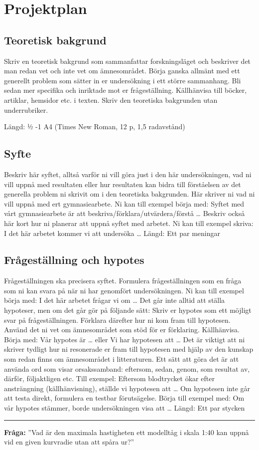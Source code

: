 \section{Projektplan}
\subsection{Teoretisk bakgrund}
Skriv en teoretisk bakgrund som sammanfattar forskningsläget och beskriver det man redan vet och inte vet om ämnesområdet. Börja ganska allmänt med ett generellt problem som sätter in er undersökning i ett större sammanhang. Bli sedan mer specifika och inriktade mot er frågeställning. Källhänvisa till böcker, artiklar, hemsidor etc. i texten. Skriv den teoretiska bakgrunden utan underrubriker.

Längd: ½ -1 A4 (Times New Roman, 12 p, 1,5 radavstånd)

\subsection{Syfte}
Beskriv här syftet, alltså varför ni vill göra just i den här undersökningen, vad ni vill uppnå med resultaten eller hur resultaten kan bidra till förståelsen av det generella problem ni skrivit om i den teoretiska bakgrunden. Här skriver ni vad ni vill uppnå med ert gymnasiearbete. Ni kan till exempel börja med: Syftet med vårt gymnasiearbete är att beskriva/förklara/utvärdera/förstå … Beskriv också här kort hur ni planerar att uppnå syftet med arbetet. Ni kan till exempel skriva: I det här arbetet kommer vi att undersöka …
Längd: Ett par meningar

\subsection{Frågeställning och hypotes}
Frågeställningen ska precisera syftet. Formulera frågeställningen som en fråga som ni kan svara på när ni har genomfört undersökningen. Ni kan till exempel börja med: I det här arbetet frågar vi om …
Det går inte alltid att ställa hypoteser, men om det går gör på följande sätt: Skriv er hypotes som ett möjligt svar på frågeställningen. Förklara därefter hur ni kom fram till hypotesen. Använd det ni vet om ämnesområdet som stöd för er förklaring. Källhänvisa. Börja med: Vår hypotes är … eller Vi har hypotesen att … Det är viktigt att ni skriver tydligt hur ni resonerade er fram till hypotesen med hjälp av den kunskap som redan finns om ämnesområdet i litteraturen. Ett sätt att göra det är att använda ord som visar orsakssamband: eftersom, sedan, genom, som resultat av, därför, följaktligen etc. Till exempel: Eftersom blodtrycket ökar efter ansträngning (källhänvisning), ställde vi hypotesen att … Om hypotesen inte går att testa direkt, formulera en testbar förutsägelse. Börja till exempel med: Om vår hypotes stämmer, borde undersökningen visa att …
Längd: Ett par stycken
\vspace{1em}
\hrule
\vspace{1em}
\textbf{Fråga:} ''Vad är den maximala hastigheten ett modelltåg i skala 1:40 kan uppnå vid en given kurvradie utan att spåra ur?''


